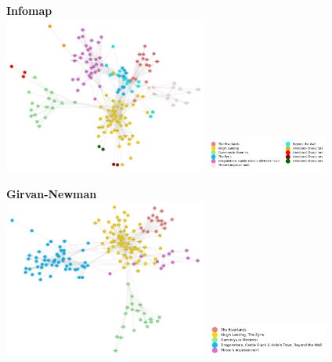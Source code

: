 \documentclass[10pt,twocolumn,letterpaper]{article}
\begin{document}
\begin{center}
    \textbf{Infomap}  \\
    \includegraphics[width=0.5\textwidth]{img/s4/communities_infomap.jpg}
    \includegraphics[width=0.3\textwidth]{img/s4/infomap_legend.jpg}\\
    \caption{\small{$\#communities=11$, $modularity=0.6$}}
\end{center}


\begin{center}
    \textbf{Girvan-Newman} \\
    \includegraphics[width=0.5\textwidth]{img/s4/communities_g-n.jpg}
    \includegraphics[width=0.3\textwidth]{img/s4/g-n_legend.jpg}\\
    \caption{\small{$\#communities=5$, $modularity=0.573$}}
\end{center}
\end{document}
